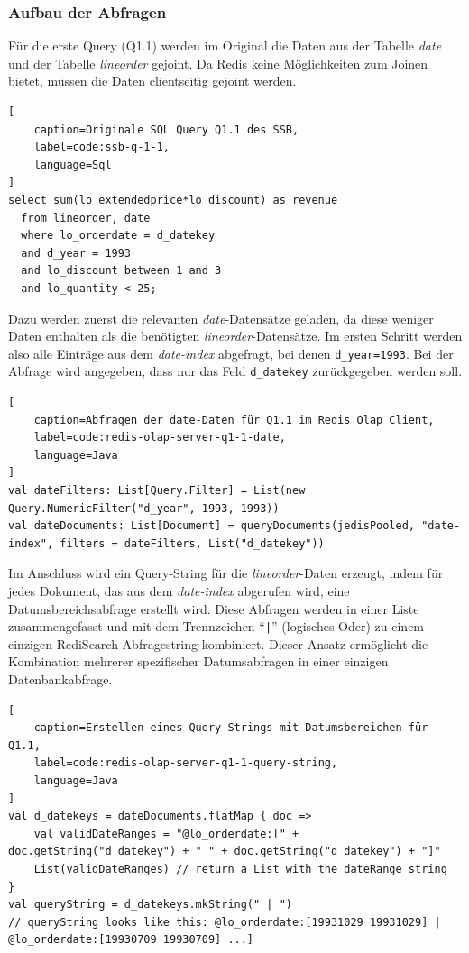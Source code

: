 \subsubsection{Aufbau der Abfragen}

Für die erste Query (Q1.1) werden im Original die Daten aus der Tabelle \emph{date} und der Tabelle \emph{lineorder} gejoint. Da Redis keine Möglichkeiten zum Joinen bietet, müssen die Daten clientseitig gejoint werden.

\begin{lstlisting}[
    caption=Originale SQL Query Q1.1 des SSB,
    label=code:ssb-q-1-1,
    language=Sql
]
select sum(lo_extendedprice*lo_discount) as revenue
  from lineorder, date
  where lo_orderdate = d_datekey
  and d_year = 1993
  and lo_discount between 1 and 3
  and lo_quantity < 25;
\end{lstlisting}

Dazu werden zuerst die relevanten \emph{date}-Datensätze geladen, da diese weniger Daten enthalten als die benötigten \emph{lineorder}-Datensätze. Im ersten Schritt werden also alle Einträge aus dem \emph{date-index} abgefragt, bei denen \lstinline|d_year=1993|. Bei der Abfrage wird angegeben, dass nur das Feld \lstinline|d_datekey| zurückgegeben werden soll.

\begin{lstlisting}[
    caption=Abfragen der date-Daten für Q1.1 im Redis Olap Client,
    label=code:redis-olap-server-q1-1-date,
    language=Java
]
val dateFilters: List[Query.Filter] = List(new Query.NumericFilter("d_year", 1993, 1993))
val dateDocuments: List[Document] = queryDocuments(jedisPooled, "date-index", filters = dateFilters, List("d_datekey"))
\end{lstlisting}

Im Anschluss wird ein Query-String für die \emph{lineorder}-Daten erzeugt, indem für jedes Dokument, das aus dem \emph{date-index} abgerufen wird, eine Datumsbereichsabfrage erstellt wird. Diese Abfragen werden in einer Liste zusammengefasst und mit dem Trennzeichen \enquote{\lstinline+|+} (logisches Oder) zu einem einzigen RediSearch-Abfragestring kombiniert. Dieser Ansatz ermöglicht die Kombination mehrerer spezifischer Datumsabfragen in einer einzigen Datenbankabfrage.

\begin{lstlisting}[
    caption=Erstellen eines Query-Strings mit Datumsbereichen für Q1.1,
    label=code:redis-olap-server-q1-1-query-string,
    language=Java
]
val d_datekeys = dateDocuments.flatMap { doc =>
	val validDateRanges = "@lo_orderdate:[" + doc.getString("d_datekey") + " " + doc.getString("d_datekey") + "]"
	List(validDateRanges) // return a List with the dateRange string
}
val queryString = d_datekeys.mkString(" | ")
// queryString looks like this: @lo_orderdate:[19931029 19931029] | @lo_orderdate:[19930709 19930709] ...]
\end{lstlisting}


